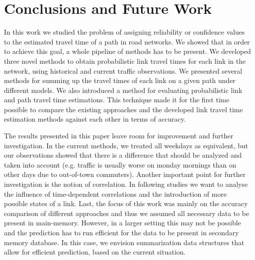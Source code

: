 \section{Conclusions and Future Work}
\label{sec:conclusion}
In this work we studied the problem of assigning reliability or confidence
values to the estimated travel time of a path in road networks. We showed
that in order to achieve this goal, a whole pipeline of methods has to be
present. We developed three novel methods to obtain probabilistic link
travel times for each link in the network, using historical and
current traffic observations. We presented several methods for summing up
the travel times of each link on a given path under different models. We also
introduced a method for evaluating probabilistic link and path travel time
estimations. This technique made it for the first time possible to compare the
existing approaches and the developed link travel time estimation methods
against each other in terms of accuracy.

The results presented in this paper leave room for improvement and further
investigation. In the current methods, we treated all weekdays as equivalent,
but our observations showed that there is a difference that should be
analyzed and taken into account (e.g. traffic is usually worse on monday
mornings than on other days due to out-of-town commuters). Another important
point for further investigation is the notion of correlation. In following
studies we want to analyse the influence of time-dependent correlations and the
introduction of more possible states of a link. Last, the focus of this work was
mainly on the accuracy comparison of different approaches and thus we assumed
all necessary data to be present in main-memory. However, in a larger setting
this may not be possible and the prediction has to run efficient for the data
to be present in secondary memory database. In this case, we envision
summarization data structures that allow for efficient prediction, based on the
current situation.
